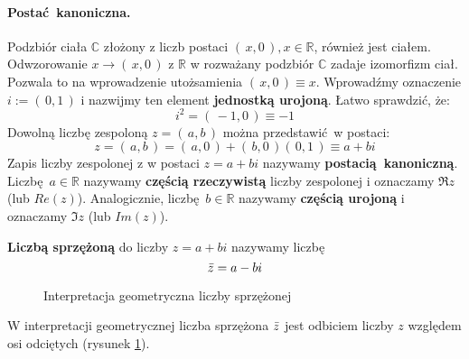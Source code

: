 \paragraph{Postać kanoniczna.} Podzbiór ciała $\mathds{C}$ złożony z liczb postaci $(\,x,0\,), x \in \mathds{R}$, również jest ciałem. Odwzorowanie $x \rightarrow (\,x,0\,)$ z $\mathds{R}$ w rozważany podzbiór $\mathds{C}$ zadaje izomorfizm ciał. Pozwala to na wprowadzenie utożsamienia $(\,x,0\,) \equiv x$. Wprowadźmy oznaczenie $i := (\,0,1\,)$ i nazwijmy ten element \textbf{jednostką urojoną}. Łatwo sprawdzić, że:
\begin{equation*}
    i^2 = (\,-1,0\,) \equiv -1
\end{equation*}
Dowolną liczbę zespoloną $z = (\,a,b\,)$ można przedstawić w postaci:
\begin{equation*}
    z = (\,a,b\,) = (\,a,0\,) + (\,b,0\,)(\,0,1\,) \equiv a+bi
\end{equation*}
Zapis liczby zespolonej z w postaci $z = a+bi$ nazywamy \textbf{postacią kanoniczną}. Liczbę $a \in \mathds{R}$ nazywamy \textbf{częścią rzeczywistą} liczby zespolonej i oznaczamy $\Re{z}$ (lub $Re(z)$). Analogicznie, liczbę $b \in \mathds{R}$ nazywamy \textbf{częścią urojoną} i oznaczamy $\Im{z}$ (lub $Im(z)$).
\begin{definition}
    \textbf{Liczbą sprzężoną} do liczby $z = a+bi$ nazywamy liczbę
    \begin{equation*}
        \bar{z} = a-bi
    \end{equation*}
\end{definition}
\begin{figure}[htbp!]
    \centering
    \caption{Interpretacja geometryczna liczby sprzężonej}
    \label{fig:lba_sprzezona}
    \vspace{3mm}
\end{figure}
W interpretacji geometrycznej liczba sprzężona $\bar{z}$ jest odbiciem liczby $z$ względem osi odciętych (rysunek \ref{fig:lba_sprzezona}).
